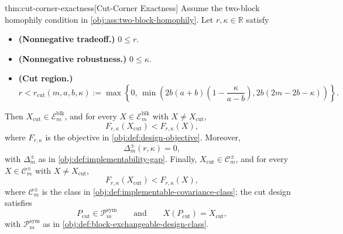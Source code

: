 \begin{theoremv}{thm:cut-corner-exactness}[Cut-Corner Exactness]
Assume the two-block homophily condition in \cref{obj:ass:two-block-homophily}. Let \(r,\kappa\in\mathbb R\) satisfy
\begin{itemize}
\item \textbf{(Nonnegative tradeoff.)} \(0\le r\).
\item \textbf{(Nonnegative robustness.)} \(0\le \kappa\).
\item \textbf{(Cut region.)}
\[
r< r_{\mathrm{cut}}(m,a,b,\kappa)
:= \max\!\left\{0,\,
\min\!\left(
2b(a+b)\left(1-\frac{\kappa}{a-b}\right),
2b(2m-2b-\kappa)
\right)\right\}.
\]
\end{itemize}
Then \(X_{\mathrm{cut}}\in\mathcal E_m^{\mathrm{blk}}\), and for every
\(X\in\mathcal E_m^{\mathrm{blk}}\) with \(X\ne X_{\mathrm{cut}}\),
\[
F_{r,\kappa}(X_{\mathrm{cut}})<F_{r,\kappa}(X),
\]
where \(F_{r,\kappa}\) is the objective in \cref{obj:def:design-objective}. Moreover,
\[
\Delta_m^{\pm}(r,\kappa)=0,
\]
with \(\Delta_m^{\pm}\) as in \cref{obj:def:implementability-gap}. Finally,
\(X_{\mathrm{cut}}\in\mathcal C_m^{\pm}\), and for every
\(X\in\mathcal C_m^{\pm}\) with \(X\ne X_{\mathrm{cut}}\),
\[
F_{r,\kappa}(X_{\mathrm{cut}})<F_{r,\kappa}(X),
\]
where \(\mathcal C_m^{\pm}\) is the class in \cref{obj:def:implementable-covariance-class}; the cut design satisfies
\[
P_{\mathrm{cut}}\in\mathcal P_m^{\mathrm{sym}}
\qquad\text{and}\qquad
X(P_{\mathrm{cut}})=X_{\mathrm{cut}},
\]
with \(\mathcal P_m^{\mathrm{sym}}\) as in \cref{obj:def:block-exchangeable-design-class}.
\end{theoremv}

